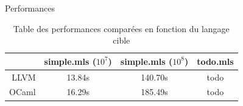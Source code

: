 \documentclass{beamer} %
\begin{document}
\begin{frame}{Performances}
    \begin{table}[h]
        \begin{center}
            \begin{tabular}{|r|c|c|c|}\hline
                                & simple.mls ($10^7$) & simple.mls ($10^8$) & todo.mls \\ \hline\hline
                          LLVM  & 13.84s             & 140.70s            & todo     \\ \hline
                          OCaml & 16.29s             & 185.49s            & todo     \\ \hline
            \end{tabular}
            \caption{Table des performances comparées en fonction du langage cible}
        \end{center}
    \end{table}
\end{frame}

\end{document}
